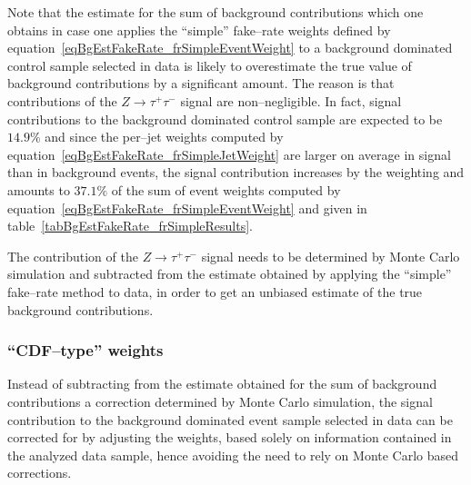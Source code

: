 Note that the estimate for the sum of background contributions which one obtains
in case one applies the ``simple'' fake--rate weights defined by
equation~\ref{eqBgEstFakeRate_frSimpleEventWeight} to a background dominated
control sample selected in data is likely to overestimate the true value of
background contributions by a significant amount.  The reason is that
contributions of the $Z \rightarrow \tau^{+} \tau^{-}$ signal are
non--negligible.  In fact, signal contributions to the background dominated
control sample are expected to be $14.9 \%$ and since the per--jet weights
computed by equation~\ref{eqBgEstFakeRate_frSimpleJetWeight} are larger on
average in signal than in background events, the signal contribution increases
by the weighting and amounts to $37.1 \%$ of the sum of event weights computed
by equation~\ref{eqBgEstFakeRate_frSimpleEventWeight} and given in
table~\ref{tabBgEstFakeRate_frSimpleResults}.

The contribution of the $Z \rightarrow \tau^{+} \tau^{-}$ signal needs to be
determined by Monte Carlo simulation and subtracted from the estimate obtained
by applying the ``simple'' fake--rate method to data, in order to get an
unbiased estimate of the true background contributions.

\subsubsection{``CDF--type'' weights}
\label{secBgEstFakeRate_frCDFtypeWeights}


Instead of subtracting from the estimate obtained for the sum of background
contributions a correction determined by Monte Carlo simulation, the signal
contribution to the background dominated event sample selected in data can be
corrected for by adjusting the weights, based solely on information contained in
the analyzed data sample, hence avoiding the need to rely on Monte Carlo based
corrections.

